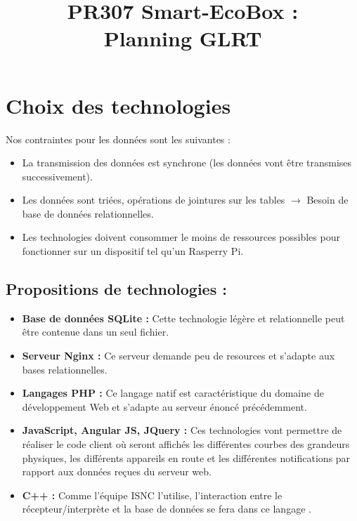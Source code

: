 \documentclass[10pt,a4paper]{article}
\title{PR307 Smart-EcoBox : \\ Planning GLRT}
\author{}
\begin{document}
\maketitle


\section{Choix des technologies}

Nos contraintes pour les données sont les suivantes :
\begin{itemize}[label=$\bullet$]
    \item La transmission des données est synchrone (les données vont être transmises successivement).
    \item Les données sont triées, opérations de jointures sur les tables $\rightarrow$ Besoin de base de données relationnelles.
    \item Les technologies doivent consommer le moins de ressources possibles pour fonctionner sur un dispositif tel qu'un Rasperry Pi.
\end{itemize}   

   \subsection*{Propositions de technologies :}
   
\begin{itemize}[label=$\bullet$]
    \setlength\itemsep{1em}
    \item \textbf{Base de données SQLite : }Cette technologie légère et relationnelle peut être contenue dans un seul fichier. 
    \item \textbf{Serveur Nginx : }Ce serveur demande peu de resources et s'adapte aux bases relationnelles.
    \item \textbf{Langages PHP : }Ce langage natif est caractéristique du domaine de développement Web et s'adapte au serveur énoncé précédemment.
    \item \textbf{JavaScript, Angular JS, JQuery : } Ces technologies vont permettre de réaliser le code client où seront affichés les différentes courbes des grandeurs physiques, les différents appareils en route et les différentes notifications par rapport aux données reçues du serveur web.
    \item \textbf{C++ :} Comme l'équipe ISNC l'utilise, l'interaction entre le récepteur/interprète et la base de données se fera dans ce langage . 
\end{itemize}
\end{document}
